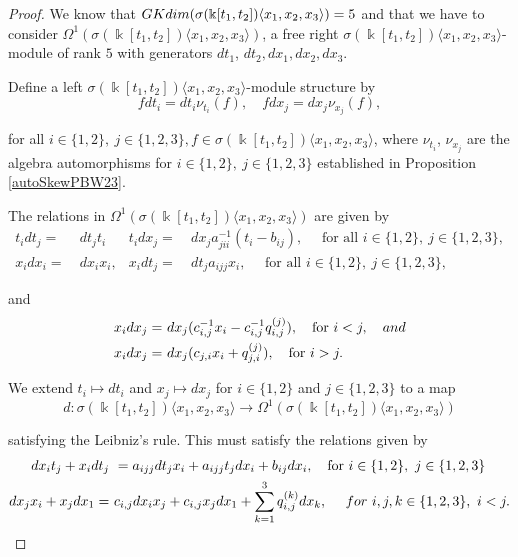 \documentclass{amsart}
\theoremstyle{definition}
\theoremstyle{remark}
\numberwithin{equation}{section}
\begin{document}
\begin{proof}
We know that ${\rm GKdim}(\sigma(\Bbbk[t_1, t_2])\langle x_1, x_2, x_3\rangle) =5$ and that we have to consider $\Omega^{1}(\sigma(\Bbbk[t_1, t_2])\langle x_1, x_2, x_3\rangle)$, a free right $\sigma(\Bbbk[t_1, t_2])\langle x_1, x_2, x_3\rangle$-module of rank $5$ with generators $dt_1$, $dt_2, dx_1, dx_2, dx_3$. 

Define a left $\sigma(\Bbbk[t_1, t_2])\langle x_1, x_2, x_3\rangle$-module structure by
    \begin{equation}\label{relrightmod323}
        f dt_i = dt_i \nu_{t_i}(f), \quad f dx_j = dx_j\nu_{x_j}(f),
    \end{equation}

for all $i\in\{1, 2\},\ j \in\{1, 2, 3\}, f \in \sigma(\Bbbk[t_1, t_2])\langle x_1, x_2, x_3\rangle$, where $\nu_{t_i}$, $\nu_{x_j}$ are the algebra automorphisms for $i\in\{1, 2\}, \ j \in\{1, 2, 3\}$  established in Proposition \ref{autoSkewPBW23}. 

The relations in $\Omega^{1}(\sigma(\Bbbk[t_1, t_2])\langle x_1, x_2, x_3\rangle)$ are given by 
    \begin{align}
        t_idt_j = &\ dt_j t_i & t_idx_j = &\ dx_ja_{jii}^{-1}(t_i-b_{ij}), \quad \text{ for all } i\in\{1, 2\},\ j \in\{1, 2, 3\}, \label{reltx5}  \\
        x_idx_i = &\ dx_ix_i,  &  x_idt_j = &\ dt_ja_{ijj}x_i, \quad \text{ for all } i\in\{1, 2\},\ j \in\{1, 2, 3\}, \label{reltx5.} 
         \end{align}

and 
        \begin{align}
        x_idx_j = &\ dx_j(c_{i,j}^{-1}x_i-c_{i,j}^{-1}q_{i,j}^{(j)}), \quad \text{for}\ i < j, \quad {\rm and} \\
        x_idx_j = &\ dx_j(c_{j,i}x_i + q_{j,i}^{(j)}), \quad \text{for}\ i > j.  \label{relxx5} 
    \end{align}

We extend $t_i\mapsto dt_i$ and $x_j\mapsto dx_j$ for $i \in \{1, 2\}$ and $j \in \{1, 2, 3\}$ to a map 
$$
d: \sigma(\Bbbk[t_1, t_2])\langle x_1, x_2, x_3\rangle \to \Omega^{1}(\sigma(\Bbbk[t_1, t_2])\langle x_1, x_2, x_3\rangle)
$$ 

satisfying the Leibniz's rule. This must satisfy the relations given by
    \begin{align*}
        dx_it_j+x_idt_j &\ = a_{ijj}dt_jx_i+a_{ijj}t_jdx_i+b_{ij}dx_i, \quad \text{for}\ i\in\{1, 2\},\ j \in\{1, 2, 3\} \\
         dx_j x_i+x_jdx_1 = &\ c_{i, j}dx_i x_j+c_{i,j}x_jdx_1 + \sum_{k=1}^{3}q_{i,j}^{(k)}dx_k, \quad\ {\rm for}\ i, j, k \in \{1, 2, 3\},\ i<j.
    \end{align*}
    

\end{proof}
\end{document}
